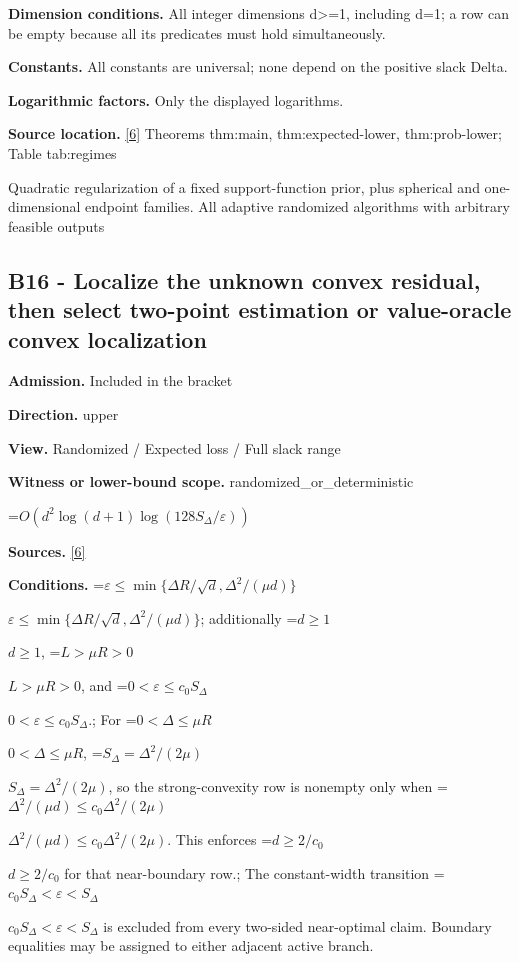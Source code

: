 \documentclass[10pt,a4paper]{article}
\newcommand{\AtlasMath}[1]{\par\begingroup\centering\setbox0=\hbox{$\displaystyle #1$}\ifdim\wd0>1.4\linewidth\typeout{ATLAS WIDE FORMULA: \the\wd0}\fi\ifdim\wd0>\linewidth\resizebox{\linewidth}{!}{\box0}\else\box0\fi\par\endgroup}
\newcommand{\AtlasInlineMath}[1]{\begingroup\setbox0=\hbox{$#1$}\ifdim\wd0>.4\linewidth\endgroup\AtlasMath{#1}\else\endgroup$#1$\fi}
\begin{document}
\textbf{Dimension conditions.} All integer dimensions d>=1, including d=1; a row can be empty because all its predicates must hold simultaneously.



\textbf{Constants.} All constants are universal; none depend on the positive slack Delta.



\textbf{Logarithmic factors.} Only the displayed logarithms.



\textbf{Source location.} \href{https://github.com/WU-Wendao/Colombo/blob/main/colombo_sensorium/Complexity_altas/data/sources/colombo/U10/manuscript.pdf}{[6]} Theorems thm:main, thm:expected-lower, thm:prob-lower; Table tab:regimes



Quadratic regularization of a fixed support-function prior, plus spherical and one-dimensional endpoint families. All adaptive randomized algorithms with arbitrary feasible outputs



\subsection{B16 - Localize the unknown convex residual, then select two-point estimation or value-oracle convex localization}


\textbf{Admission.} Included in the bracket



\textbf{Direction.} upper



\textbf{View.} Randomized / Expected loss / Full slack range



\textbf{Witness or lower-bound scope.} randomized\_or\_deterministic



\AtlasMath{O\!\left(d^2\log(d+1)\log(128S_\Delta/\varepsilon)\right)}


\textbf{Sources.} \href{https://github.com/WU-Wendao/Colombo/blob/main/colombo_sensorium/Complexity_altas/data/sources/colombo/U10/manuscript.pdf}{[6]}



\textbf{Conditions.} \AtlasInlineMath{\varepsilon\le\min\{\Delta R/\sqrt d,\Delta^2/(\mu d)\}}; additionally \AtlasInlineMath{d\ge1}, \AtlasInlineMath{L>\mu R>0}, and \AtlasInlineMath{0<\varepsilon\le c_0S_\Delta}.; For \AtlasInlineMath{0<\Delta\le\mu R}, \AtlasInlineMath{S_\Delta=\Delta^2/(2\mu)}, so the strong-convexity row is nonempty only when \AtlasInlineMath{\Delta^2/(\mu d)\le c_0\Delta^2/(2\mu)}. This enforces \AtlasInlineMath{d\ge2/c_0} for that near-boundary row.; The constant-width transition \AtlasInlineMath{c_0S_\Delta<\varepsilon<S_\Delta} is excluded from every two-sided near-optimal claim. Boundary equalities may be assigned to either adjacent active branch.
\end{document}
